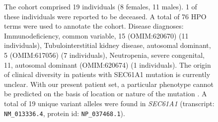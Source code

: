 \begin{figure}[htbp]
        \vspace{2em}
        
        \caption{ The cohort comprised 19 individuals (8 females, 11 males). 1 of these individuals were reported to be deceased. A total of 76 HPO terms were used to annotate the cohort. Disease diagnoses: Immunodeficiency, common variable, 15 (OMIM:620670) (11 individuals), Tubulointerstitial kidney disease, autosomal dominant, 5 (OMIM:617056) (7 individuals), Neutropenia, severe congenital, 11, autosomal dominant (OMIM:620674) (1 individuals). The origin of clinical diversity in patients with SEC61A1 mutation is currently unclear. 
        With our present patient set, a particular phenotype cannot be predicted on the basis of location or nature of the mutation \cite{PMID_32325141}.
         A total of 19 unique variant alleles were found in \textit{SEC61A1} (transcript: \texttt{NM\_013336.4}, protein id: \texttt{NP\_037468.1}).}
        \end{figure}
        